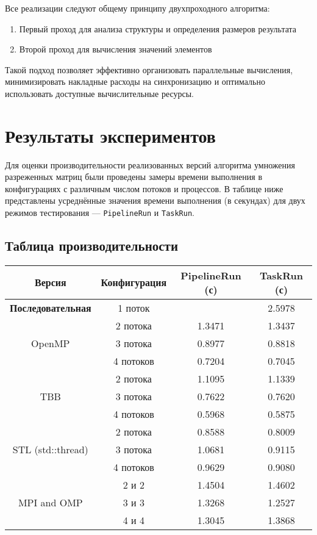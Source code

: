 \documentclass[12pt]{article}
\begin{document}
Все реализации следуют общему принципу двухпроходного алгоритма:
\begin{enumerate}
\item Первый проход для анализа структуры и определения размеров результата
\item Второй проход для вычисления значений элементов
\end{enumerate}
Такой подход позволяет эффективно организовать параллельные вычисления, минимизировать накладные расходы на синхронизацию и оптимально использовать доступные вычислительные ресурсы.

\section{Результаты экспериментов}

\hspace*{1.25em}Для оценки производительности реализованных версий алгоритма умножения разреженных матриц были проведены замеры времени выполнения в конфигурациях с различным числом потоков и процессов. В таблице ниже представлены усреднённые значения времени выполнения (в секундах) для двух режимов тестирования — \texttt{PipelineRun} и \texttt{TaskRun}.

\subsection{Таблица производительности}

\renewcommand{\arraystretch}{1.4}
\begin{table}[H]
\centering
\footnotesize
\begin{tabular}{|c|c|c|c|}
\hline
\textbf{Версия} & \textbf{Конфигурация} & \textbf{PipelineRun (с)} & \textbf{TaskRun (с)} \\
\hline
\textbf{Последовательная} & 1 поток & \centering 2.6001 & 2.5978 \\
\hline
\multirow{3}{*}{OpenMP} 
  & 2 потока & 1.3471 & 1.3437 \\
  & 3 потока & 0.8977 & 0.8818 \\
  & 4 потоков & 0.7204 & 0.7045 \\
\hline
\multirow{3}{*}{TBB} 
  & 2 потока & 1.1095 & 1.1339 \\
  & 3 потока & 0.7622 & 0.7620 \\
  & 4 потоков & 0.5968 & 0.5875 \\
\hline
\multirow{3}{*}{STL (std::thread)} 
  & 2 потока & 0.8588 & 0.8009 \\
  & 3 потока & 1.0681 & 0.9115 \\
  & 4 потоков & 0.9629 & 0.9080 \\
\hline
\multirow{3}{*}{MPI and OMP} 
  & 2 и 2 & 1.4504 & 1.4602 \\
  & 3 и 3 & 1.3268 & 1.2527 \\
  & 4 и 4 & 1.3045 & 1.3868 \\
\hline
\end{tabular}
\label{tab:parallel_perf}
\end{table}
\end{document}

